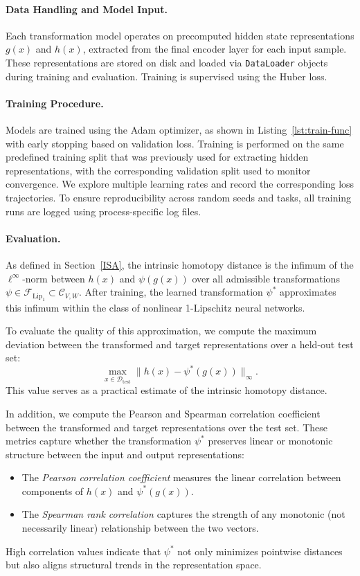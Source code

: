 \paragraph{Data Handling and Model Input.}
Each transformation model operates on precomputed hidden state representations \( g(x) \) and \( h(x) \), extracted from the final encoder layer for each input sample.  
These representations are stored on disk and loaded via \texttt{DataLoader} objects during training and evaluation.  
Training is supervised using the Huber loss.

\paragraph{Training Procedure.}
Models are trained using the Adam optimizer, as shown in Listing~\ref{lst:train-func} with early stopping based on validation loss.  
Training is performed on the same predefined training split that was previously used for extracting hidden representations, with the corresponding validation split used to monitor convergence.  
We explore multiple learning rates and record the corresponding loss trajectories.  
To ensure reproducibility across random seeds and tasks, all training runs are logged using process-specific log files.


\paragraph{Evaluation.}
As defined in Section~\ref{ISA}, the intrinsic homotopy distance is the infimum of the \( \ell^\infty \)-norm between \( h(x) \) and \( \psi(g(x)) \) over all admissible transformations \( \psi \in \mathcal{F}_{\mathrm{Lip}_1} \subset \mathcal{C}_{V,W} \).  
After training, the learned transformation \( \psi^* \) approximates this infimum within the class of nonlinear 1-Lipschitz neural networks.

To evaluate the quality of this approximation, we compute the maximum deviation between the transformed and target representations over a held-out test set:
\[
\max_{x \in \mathcal{D}_{\mathrm{test}}} \| h(x) - \psi^*(g(x)) \|_\infty.
\]
This value serves as a practical estimate of the intrinsic homotopy distance.

In addition, we compute the Pearson and Spearman correlation coefficient between the transformed and target representations over the test set.  
These metrics capture whether the transformation \( \psi^* \) preserves linear or monotonic structure between the input and output representations:
\begin{itemize}
	\item The \emph{Pearson correlation coefficient} measures the linear correlation between components of \( h(x) \) and \( \psi^*(g(x)) \).
	\item The \emph{Spearman rank correlation} captures the strength of any monotonic (not necessarily linear) relationship between the two vectors.
\end{itemize}
High correlation values indicate that \( \psi^* \) not only minimizes pointwise distances but also aligns structural trends in the representation space.

